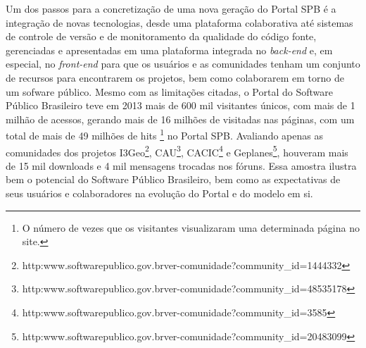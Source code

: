 Um dos passos para a concretização de uma nova geração do Portal SPB é a
integração de novas tecnologias, desde uma plataforma colaborativa até sistemas
de controle de versão e de monitoramento da qualidade do código fonte,
gerenciadas e apresentadas em uma plataforma integrada no {\it back-end} e, em especial,
no {\it front-end} para que os usuários e as comunidades tenham um conjunto de
recursos para encontrarem os projetos, bem como colaborarem em torno de um
sofware público.
%
Mesmo com as limitações citadas, o Portal do Software Público Brasileiro teve
em 2013 mais de 600 mil visitantes únicos, com mais de 1 milhão de acessos,
gerando mais de 16 milhões de visitadas nas páginas, com um total de mais de 49
milhões de hits \footnote{O número de vezes que os visitantes visualizaram uma
determinada página no site.} no Portal SPB.
%
Avaliando apenas as comunidades dos projetos I3Geo\footnote{http:\/\/www.softwarepublico.gov.br\/ver-comunidade?community\_id=1444332}, CAU\footnote{http:\/\/www.softwarepublico.gov.br\/ver-comunidade?community\_id=48535178}, CACIC\footnote{http:\/\/www.softwarepublico.gov.br\/ver-comunidade?community\_id=3585} e Geplanes\footnote{http:\/\/www.softwarepublico.gov.br\/ver-comunidade?community\_id=20483099}, houveram
mais de 15 mil downloads e 4 mil mensagens trocadas nos fóruns.
%
Essa amostra ilustra bem o potencial do Software Público Brasileiro, bem como
as expectativas de seus usuários e colaboradores na evolução do Portal e
do modelo em si.


